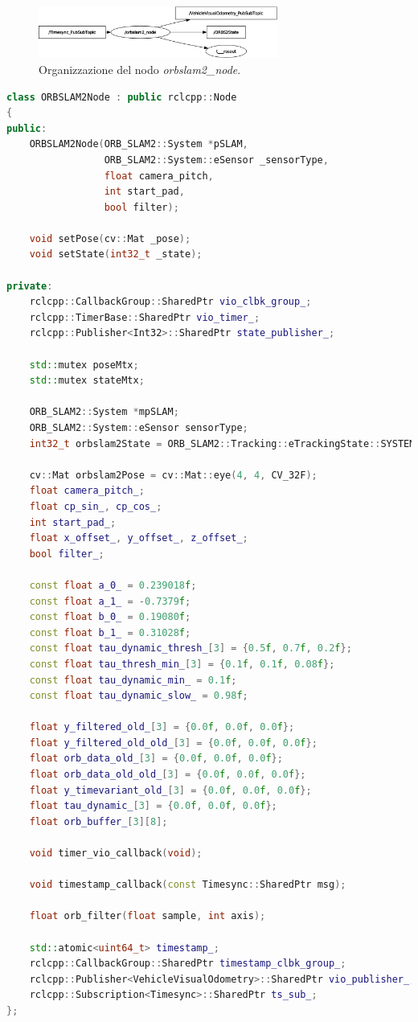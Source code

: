 \begin{figure}
    \centering
    \includegraphics[width=0.7\textwidth]{figs/chapter3/orbslam2node.png}
    \caption{Organizzazione del nodo \emph{orbslam2\_node}.}
    \label{fig:orb2node}
\end{figure}

\begin{lstlisting}[language=C++, caption={Definizione del nodo \emph{orbslam2\_node}.}, label={lst:orb2node}]
class ORBSLAM2Node : public rclcpp::Node
{
public:
    ORBSLAM2Node(ORB_SLAM2::System *pSLAM,
                 ORB_SLAM2::System::eSensor _sensorType,
                 float camera_pitch,
                 int start_pad,
                 bool filter);

    void setPose(cv::Mat _pose);
    void setState(int32_t _state);

private:
    rclcpp::CallbackGroup::SharedPtr vio_clbk_group_;
    rclcpp::TimerBase::SharedPtr vio_timer_;
    rclcpp::Publisher<Int32>::SharedPtr state_publisher_;

    std::mutex poseMtx;
    std::mutex stateMtx;

    ORB_SLAM2::System *mpSLAM;
    ORB_SLAM2::System::eSensor sensorType;
    int32_t orbslam2State = ORB_SLAM2::Tracking::eTrackingState::SYSTEM_NOT_READY;

    cv::Mat orbslam2Pose = cv::Mat::eye(4, 4, CV_32F);
    float camera_pitch_;
    float cp_sin_, cp_cos_;
    int start_pad_;
    float x_offset_, y_offset_, z_offset_;
    bool filter_;

    const float a_0_ = 0.239018f;
    const float a_1_ = -0.7379f;
    const float b_0_ = 0.19080f;
    const float b_1_ = 0.31028f;
    const float tau_dynamic_thresh_[3] = {0.5f, 0.7f, 0.2f};
    const float tau_thresh_min_[3] = {0.1f, 0.1f, 0.08f};
    const float tau_dynamic_min_ = 0.1f;
    const float tau_dynamic_slow_ = 0.98f;

    float y_filtered_old_[3] = {0.0f, 0.0f, 0.0f};
    float y_filtered_old_old_[3] = {0.0f, 0.0f, 0.0f};
    float orb_data_old_[3] = {0.0f, 0.0f, 0.0f};
    float orb_data_old_old_[3] = {0.0f, 0.0f, 0.0f};
    float y_timevariant_old_[3] = {0.0f, 0.0f, 0.0f};
    float tau_dynamic_[3] = {0.0f, 0.0f, 0.0f};
    float orb_buffer_[3][8];

    void timer_vio_callback(void);

    void timestamp_callback(const Timesync::SharedPtr msg);

    float orb_filter(float sample, int axis);

    std::atomic<uint64_t> timestamp_;
    rclcpp::CallbackGroup::SharedPtr timestamp_clbk_group_;
    rclcpp::Publisher<VehicleVisualOdometry>::SharedPtr vio_publisher_;
    rclcpp::Subscription<Timesync>::SharedPtr ts_sub_;
};
\end{lstlisting}
\clearpage

